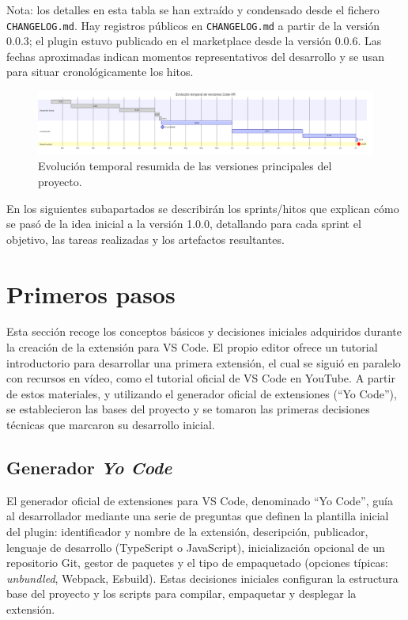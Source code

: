 \documentclass[a4paper, 12pt]{book}
\begin{document}
\noindent Nota: los detalles en esta tabla se han extraído y condensado desde el fichero \texttt{CHANGELOG.md}. Hay registros públicos en \texttt{CHANGELOG.md} a partir de la versión 0.0.3; el plugin estuvo publicado en el marketplace desde la versión 0.0.6. Las fechas aproximadas indican momentos representativos del desarrollo y se usan para situar cronológicamente los hitos.


\begin{figure}[H]
  \centering
  \includegraphics[width=\textwidth]{img/versions_gantt.png}
  \caption{Evolución temporal resumida de las versiones principales del proyecto.}
  \label{fig:timeline-versions}
\end{figure}


\noindent En los siguientes subapartados se describirán los sprints/hitos que explican cómo se pasó de la idea inicial a la versión 1.0.0, detallando para cada sprint el objetivo, las tareas realizadas y los artefactos resultantes.



\section{Primeros pasos}
\label{sec:primeros-pasos}

Esta sección recoge los conceptos básicos y decisiones iniciales adquiridos durante la creación de la extensión para VS Code. El propio editor ofrece un tutorial introductorio para desarrollar una primera extensión\cite{tutorialVSCode}, el cual se siguió en paralelo con recursos en vídeo, como el tutorial oficial de VS Code en YouTube\cite{vscode-youtube}. A partir de estos materiales, y utilizando el generador oficial de extensiones (``Yo Code'')\cite{yo-code}, se establecieron las bases del proyecto y se tomaron las primeras decisiones técnicas que marcaron su desarrollo inicial.

\subsection{Generador \emph{Yo Code}}
El generador oficial de extensiones para VS Code, denominado ``Yo Code'', guía al desarrollador mediante una serie de preguntas que definen la plantilla inicial del plugin: identificador y nombre de la extensión, descripción, publicador, lenguaje de desarrollo (TypeScript o JavaScript), inicialización opcional de un repositorio Git, gestor de paquetes y el tipo de empaquetado (opciones típicas: \emph{unbundled}, Webpack, Esbuild). Estas decisiones iniciales configuran la estructura base del proyecto y los scripts para compilar, empaquetar y desplegar la extensión.
\end{document}
